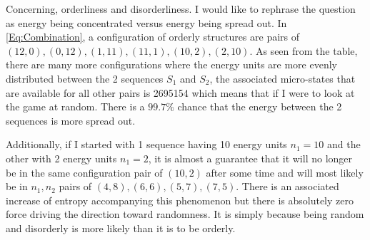 \vspace{0,3cm}
Concerning, orderliness and disorderliness. I would like to rephrase the question as energy being concentrated versus energy being spread out. In \ref{Eq:Combination}, a configuration of orderly structures are pairs of $(12,0),(0,12),(1,11),(11,1),(10,2),(2,10)$. As seen from the table, there are many more configurations where the energy units are more evenly distributed between the 2 sequences $S_{1}$ and $S_{2}$, the associated micro-states that are available for all other pairs is 2695154 which means that if I were to look at the game at random. There is a $99.7\%$ chance that the energy between the 2 sequences is more spread out. \par

\vspace{0.3cm}
Additionally, if I started with 1 sequence having 10 energy units $n_{1}=10$ and the other with 2 energy units $n_{1}=2$, it is almost a guarantee that it will no longer be in the same configuration pair of $(10,2)$ after some time and will most likely be in $n_{1},n_{2}$ pairs of $(4,8),(6,6), (5,7), (7,5)$. There is an associated increase of entropy accompanying this phenomenon but there is absolutely zero force driving the direction toward randomness. It is simply because being random and disorderly is more likely than it is to be orderly. 
